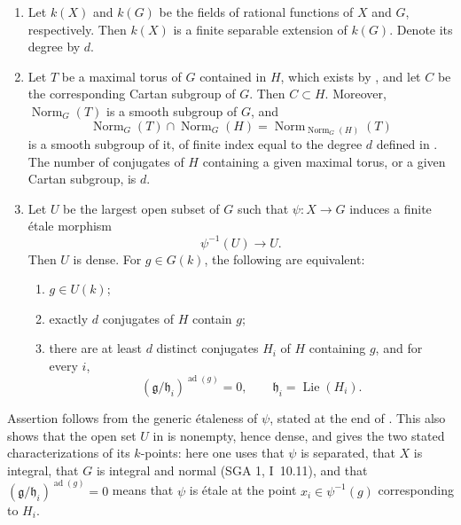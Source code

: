 \begin{enumerate}
\item[\textit{a)}] 
  Let \(k(X)\) and \(k(G)\) be the fields of rational functions of
  \(X\) and \(G\), respectively. Then \(k(X)\) is a finite separable
  extension of \(k(G)\). Denote its degree by \(d\).

\item[\textit{b)}] 
  Let \(T\) be a maximal torus of \(G\) contained in \(H\), which
  exists by , and let \(C\) be the corresponding Cartan
  subgroup of \(G\). Then \(C\subset H\). Moreover,
  \(\operatorname{Norm}_G(T)\) is a smooth subgroup of \(G\), and
  \[
    \operatorname{Norm}_G(T)\cap\operatorname{Norm}_G(H)
    =
    \operatorname{Norm}_{\operatorname{Norm}_G(H)}(T)
  \]
  is a smooth subgroup of it, of finite index equal to the degree
  \(d\) defined in . The number of conjugates of \(H\) containing
  a given maximal torus, or a given Cartan subgroup, is \(d\).

\item[\textit{c)}] 
  Let \(U\) be the largest open subset of \(G\) such that
  \(\psi:X\to G\) induces a finite étale morphism
  \[
    \psi^{-1}(U)\longrightarrow U.
  \]
  Then \(U\) is dense. For \(g\in G(k)\), the following are
  equivalent:
  \begin{enumerate}
  \item {} \(g\in U(k)\);
  \item {} exactly \(d\) conjugates of \(H\) contain \(g\);
  \item {} there are at least \(d\) distinct conjugates \(H_i\) of \(H\)
    containing \(g\), and for every \(i\),
    \[
      (\mathfrak g/\mathfrak h_i)^{\operatorname{ad}(g)}=0,
      \qquad \mathfrak h_i=\operatorname{Lie}(H_i).
    \]
  \end{enumerate}
\end{enumerate}

Assertion  follows from the generic étaleness of \(\psi\), stated
at the end of . This also shows that the open set \(U\) in  is
nonempty, hence dense, and gives the two stated characterizations of
its \(k\)-points: here one uses that \(\psi\) is separated, that
\(X\) is integral, that \(G\) is integral and normal (SGA 1,
I~10.11), and that
\((\mathfrak g/\mathfrak h_i)^{\operatorname{ad}(g)}=0\) means that
\(\psi\) is étale at the point \(x_i\in\psi^{-1}(g)\) corresponding
to \(H_i\).

